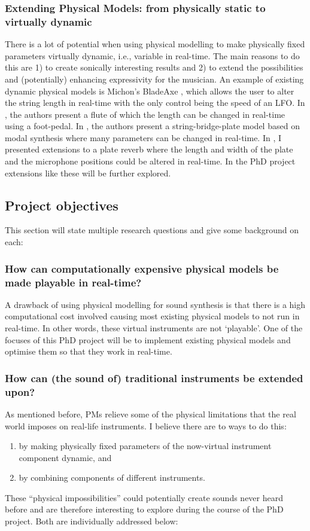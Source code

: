 \subsubsection*{Extending Physical Models: from physically static to virtually dynamic}
There is a lot of potential when using physical modelling to make physically fixed parameters virtually dynamic, i.e., variable in real-time. The main reasons to do this are 1) to create sonically interesting results and 2) to extend the possibilities and (potentially) enhancing expressivity for the musician.
An example of existing dynamic physical models is Michon’s BladeAxe \cite{Michon2016}, which allows the user to alter the string length in real-time with the only control being the speed of an LFO. In \cite{Gelineck2005}, the authors present a flute of which the length can be changed in real-time using a foot-pedal. In \cite{Walstijn2017}, the authors present a string-bridge-plate model based on modal synthesis where many parameters can be changed in real-time. In \cite{Willemsen2017}, I presented extensions to a plate reverb where the length and width of the plate and the microphone positions could be altered in real-time. In the PhD project extensions like these will be further explored.

\subsection{Project objectives}
This section will state multiple research questions and give some background on each:
\subsubsection*{How can computationally expensive physical models be made playable in real-time?}
A drawback of using physical modelling for sound synthesis is that there is a high computational cost involved causing most existing physical models to not run in real-time. In other words, these virtual instruments are not ‘playable’. One of the focuses of this PhD project will be to implement existing physical models and optimise them so that they work in real-time. 

\subsubsection*{How can (the sound of) traditional instruments be extended upon?}
As mentioned before, PMs relieve some of the physical limitations that the real world imposes on real-life instruments.  I believe there are to ways to do this: 
\begin{enumerate}
    \item by making physically fixed parameters of the now-virtual instrument component dynamic, and
    \item by combining components of different instruments.
\end{enumerate}
These ``physical impossibilities'' could potentially create sounds never heard before and are therefore interesting to explore during the course of the PhD project. Both are individually addressed below:
\\


